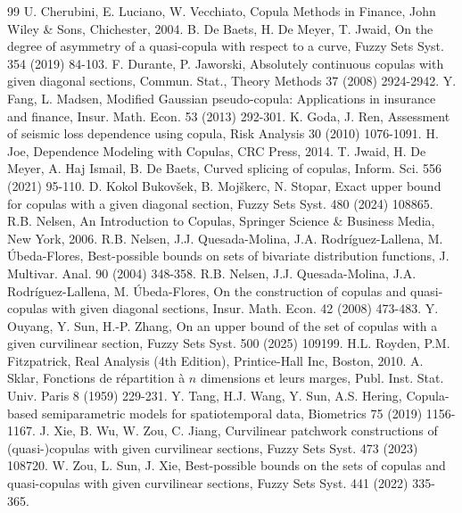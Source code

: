 \documentclass[12pt]{article}
\theoremstyle{plain}
\theoremstyle{definition}
\begin{document}
\begin{thebibliography}{99}
U. Cherubini, E. Luciano, W. Vecchiato, Copula Methods in Finance, John Wiley \& Sons, Chichester, 2004.
%
B. De Baets, H. De Meyer, T. Jwaid, On the degree of asymmetry of a quasi-copula with respect to a curve, Fuzzy Sets Syst. 354 (2019) 84-103.
%
F. Durante, P. Jaworski, Absolutely continuous copulas with given diagonal sections, Commun. Stat., Theory Methods 37 (2008) 2924-2942.
%
Y. Fang, L. Madsen, Modified Gaussian pseudo-copula: Applications in insurance and finance, Insur. Math. Econ. 53 (2013) 292-301.
%
K. Goda, J. Ren, Assessment of seismic loss dependence using copula, Risk Analysis 30 (2010) 1076-1091.
%
H. Joe, Dependence Modeling with Copulas, CRC Press, 2014.
%
T. Jwaid, H. De Meyer, A. Haj Ismail, B. De Baets, Curved splicing of copulas, Inform. Sci. 556 (2021) 95-110.
%
D. Kokol Bukov\v{s}ek, B. Moj\v{s}kerc, N. Stopar, Exact upper bound for copulas with a given diagonal section,
Fuzzy Sets Syst. 480 (2024) 108865.
%
R.B. Nelsen, An Introduction to Copulas, Springer Science \& Business Media, New York, 2006.
%
R.B. Nelsen, J.J. Quesada-Molina, J.A. Rodr\'{i}guez-Lallena, M. \'{U}beda-Flores, Best-possible bounds on sets of bivariate distribution functions,
J. Multivar. Anal. 90 (2004) 348-358.
%
R.B. Nelsen, J.J. Quesada-Molina, J.A. Rodr\'{i}guez-Lallena, M. \'{U}beda-Flores, On the construction of copulas and quasi-copulas with given diagonal sections, Insur. Math. Econ. 42 (2008) 473-483.
%
Y. Ouyang, Y. Sun, H.-P. Zhang, On an upper bound of the set of copulas with a given curvilinear section, Fuzzy Sets Syst. 500 (2025) 109199.
%
H.L. Royden, P.M. Fitzpatrick, Real Analysis (4th Edition), Printice-Hall Inc, Boston, 2010.
%
A. Sklar, Fonctions de r\'{e}partition \`{a} $n$ dimensions et leurs marges, Publ. Inst. Stat. Univ. Paris 8 (1959) 229-231.
%
Y. Tang, H.J. Wang, Y. Sun, A.S. Hering, Copula-based semiparametric models for spatiotemporal data, Biometrics 75 (2019) 1156-1167.
%
J. Xie, B. Wu, W. Zou, C. Jiang, Curvilinear patchwork constructions of (quasi-)copulas with given curvilinear sections, Fuzzy Sets Syst. 473 (2023) 108720.
%
W. Zou, L. Sun, J. Xie, Best-possible bounds on the sets of copulas and quasi-copulas with given curvilinear sections, Fuzzy Sets Syst. 441 (2022) 335-365.

\end{thebibliography}
\end{document}
